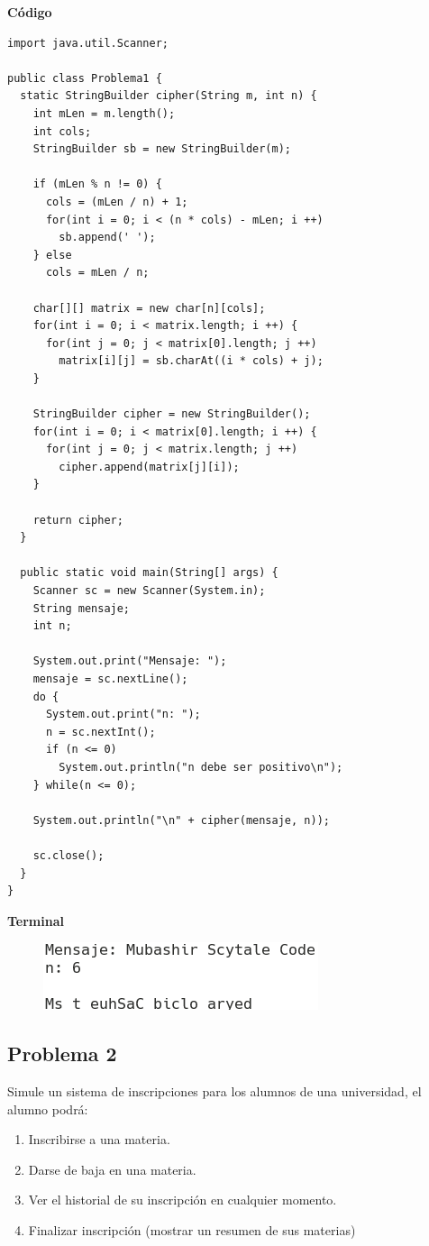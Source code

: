 \documentclass[11pt, twocolumn]{article}
\begin{document}
  \textbf{Código}
  \begin{lstlisting}
import java.util.Scanner;

public class Problema1 {
  static StringBuilder cipher(String m, int n) {
    int mLen = m.length();
    int cols;
    StringBuilder sb = new StringBuilder(m);

    if (mLen % n != 0) {
      cols = (mLen / n) + 1;
      for(int i = 0; i < (n * cols) - mLen; i ++)
        sb.append(' ');
    } else 
      cols = mLen / n;
    
    char[][] matrix = new char[n][cols];
    for(int i = 0; i < matrix.length; i ++) {
      for(int j = 0; j < matrix[0].length; j ++)
        matrix[i][j] = sb.charAt((i * cols) + j);
    }
    
    StringBuilder cipher = new StringBuilder();
    for(int i = 0; i < matrix[0].length; i ++) {
      for(int j = 0; j < matrix.length; j ++)
        cipher.append(matrix[j][i]);
    }

    return cipher;
  }

  public static void main(String[] args) {
    Scanner sc = new Scanner(System.in);
    String mensaje;
    int n;

    System.out.print("Mensaje: ");
    mensaje = sc.nextLine();
    do {
      System.out.print("n: ");
      n = sc.nextInt();
      if (n <= 0)
        System.out.println("n debe ser positivo\n");
    } while(n <= 0);

    System.out.println("\n" + cipher(mensaje, n));

    sc.close();
  }
}    
  \end{lstlisting}

  \textbf{Terminal}
  \begin{figure}[ht]
    \includegraphics[width=0.6\columnwidth, center]{P1.png}
  \end{figure}


  \subsection*{Problema 2}
  Simule un sistema de inscripciones para los alumnos de una universidad, el alumno podrá:

  \begin{enumerate}[label=\alph*.]
    \item Inscribirse a una materia.
    \item Darse de baja en una materia.
    \item Ver el historial de su inscripción en cualquier momento.
    \item Finalizar inscripción (mostrar un resumen de sus materias)
  \end{enumerate}
\end{document}
